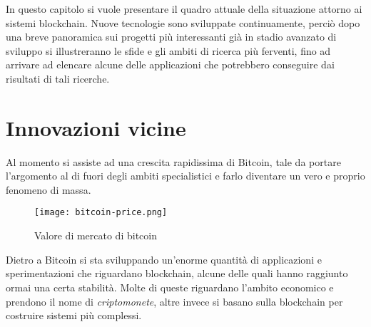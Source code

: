 In questo capitolo si vuole presentare il quadro attuale della situazione attorno ai sistemi blockchain. Nuove tecnologie sono sviluppate continuamente, perciò dopo una breve panoramica sui progetti più interessanti già in stadio avanzato di sviluppo si illustreranno le sfide e gli ambiti di ricerca più ferventi, fino ad arrivare ad elencare alcune delle applicazioni che potrebbero conseguire dai risultati di tali ricerche.

\section{Innovazioni vicine}
    Al momento si assiste ad una crescita rapidissima di Bitcoin, tale da portare l'argomento al di fuori degli ambiti specialistici e farlo diventare un vero e proprio fenomeno di massa.
    \begin{figure}[ht]
        \centering
        \texttt{[image: bitcoin-price.png]}
        \caption{Valore di mercato di bitcoin}
        \label{fig:bitcoin_price}
    \end{figure}
    Dietro a Bitcoin si sta sviluppando un'enorme quantità di applicazioni e sperimentazioni che riguardano blockchain, alcune delle quali hanno raggiunto ormai una certa stabilità. Molte di queste riguardano l'ambito economico e prendono il nome di \emph{criptomonete}, altre invece si basano sulla blockchain per costruire sistemi più complessi.
    
